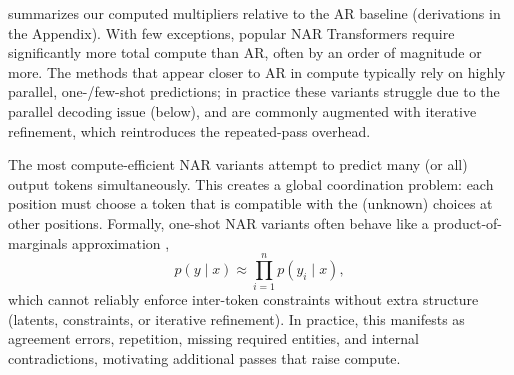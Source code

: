 \documentclass[11pt]{article}
\begin{document}
 summarizes our computed multipliers relative to the AR baseline (derivations in the Appendix). With few exceptions, popular NAR Transformers require significantly more total compute than AR, often by an order of magnitude or more. The methods that appear closer to AR in compute typically rely on highly parallel, one-/few-shot predictions; in practice these variants struggle due to the parallel decoding issue (below), and are commonly augmented with iterative refinement, which reintroduces the repeated-pass overhead.

The most compute-efficient NAR variants attempt to predict many (or all) output tokens simultaneously.
This creates a global coordination problem: each position must choose a token that is compatible with the (unknown) choices at other positions.
Formally, one-shot NAR variants often behave like a product-of-marginals approximation \citep{gu2018nonautoregressive},
\[
p(y\mid x)\approx \prod_{i=1}^{n} p(y_i\mid x),
\]
which cannot reliably enforce inter-token constraints without extra structure (latents, constraints, or iterative refinement).
In practice, this manifests as agreement errors, repetition, missing required entities, and internal contradictions, motivating additional passes that raise compute.
\end{document}
